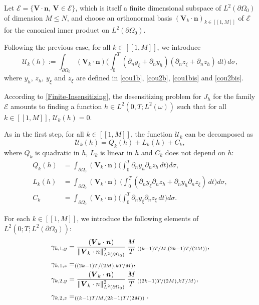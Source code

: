 \documentclass[11pt]{article}
\makeatletter
\numberwithin{equation}{section}
\newcommand{\llbracket}{[\![}
\newcommand{\rrbracket}{]\!]}
\newcommand{\bn}{\boldsymbol{n}}
\newcommand{\bV}{\boldsymbol{V}}
\DeclareRobustCommand{\mathbbm}[1]{\csname jepbb@#1\endcsname}
\newcommand{\norm}[1]{\Vert#1\Vert}
\theoremstyle{definition}
\makeatother
\begin{document}
Let $\mathscr{E} = \{ \bV\cdot \bn,\, \bV \in \mathcal{E}\}$, which is itself a finite dimensional subspace of $L^2(\partial\Omega_0)$ of dimension $M\leqslant N$, and choose an orthonormal basis $(\bV_k\cdot \bn)_{k \in \llbracket 1, M\rrbracket}$ of $\mathscr{E}$ for the canonical inner product on $L^2(\partial\Omega_0)$.

Following the previous case, for all $k \in \llbracket 1,M \rrbracket $, we introduce
\begin{equation}
\label{argenton2}
\mathcal{U}_k(h):=
\int_{\partial\Omega_{0}}(\bV_k\cdot \bn)
\biggl(\int_{0}^{T}(\partial_{n} y_{\xi} + \partial_n y_h) (\partial_{n} z_{\xi} + \partial_n z_h)\, dt \biggr)
\, d\sigma,
\end{equation}
where $y_{h}$, $z_{h}$, $ y_{\xi}$ and $z_{\xi}$ are defined in \eqref{cou1b}, \eqref{cou2b}, \eqref{cou1bis} and \eqref{cou2bis}.

According to \eqref{Finite-Insensitizing}, the desensitizing problem for $J_h$ for the family $\mathcal{E}$ amounts to finding {a function} $h \in L^2(0,T; L^2(\omega))$ such that for all $k \in \llbracket 1,M \rrbracket $, $\mathcal{U}_k(h) = 0$.

As in the first step, for all $k \in \llbracket 1,M \rrbracket $, the function $\mathcal{U}_k$ can be decomposed as
\begin{equation}
\label{Decomposition-U-k}
\mathcal{U}_k(h)=Q_k(h)+L_k(h)+C_k,
\end{equation}
where $Q_k$ is quadratic in $h$, $L_k$ is linear in $h$ and $C_k$ does not depend on $h$:
\begin{align}
\label{Def-Q-k}
Q_k(h)&= \int_{\partial \Omega_0} (\bV_k\cdot \bn)
\biggl(\int_0^T \partial_{n} y_{h}\partial_{n} z_{h}\, dt\biggr) d\sigma,
\\
\label{Def-L-k}
L_k(h)&= \int_{\partial \Omega_0}(\bV_k\cdot \bn) \
\biggl(\int_0^T (\partial_{n} y_{\xi}\partial_{n} z_{h}+\partial_{n} y_{h}\partial_{n} z_{\xi})\, dt \biggr)d\sigma,
\\
\label{Def-C-k}
C_k&= \int_{\partial \Omega_0} (\bV_k\cdot \bn)
\biggl(\int_0^T \partial_{n} y_{\xi}\partial_{n} z_{\xi}\, dt \biggr)
d\sigma.
\end{align}

For each $k \in \llbracket 1,M \rrbracket $, we introduce the following elements of $L^2(0;T; L^2(\partial \Omega_0))$:
\begin{align*}
\gamma_{k,1,y} &= \frac{(\bV_k \cdot \bn)}{\norm{\bV_k\cdot n}_{L^2(\partial\Omega_0)}^2}\,\frac{M }{T}\, \mathbbm{1}_{((k-1)T/M,(2k-1)T/(2M))},\\
 \gamma_{k,1,z} &= \mathbbm{1}_{((2k-1)T/(2M), kT/M)},\\
\gamma_{k,2, y} &= \frac{(\bV_k \cdot \bn)}{\norm{\bV_k\cdot n}_{L^2(\partial\Omega_0)}^2}\,\frac{M}{T}\,\mathbbm{1}_{((2k-1)T/(2M), kT/M)},\\
\gamma_{k,2, z} &= \mathbbm{1}_{((k-1)T/M,(2k-1)T/(2M))}.
\end{align*}
\end{document}
